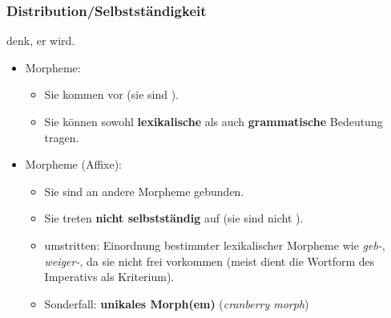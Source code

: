 \begin{frame}
\frametitle{Distribution/Selbstständigkeit}

\ea {} denk,  er    wird.
\z

\begin{itemize}

	\item {} Morpheme: 
	
	\begin{itemize}
		\item Sie kommen  vor (sie sind ).
		
		\item Sie können sowohl \textbf{lexikalische} als auch \textbf{grammatische} Bedeutung tragen.
	\end{itemize}
	
\pause
	
	\item {} Morpheme (Affixe): 
	
	\begin{itemize}
		\item Sie sind an andere Morpheme gebunden.
		
		\item Sie treten \textbf{nicht selbstständig} auf (sie sind nicht ).
		
		\item umstritten: Einordnung bestimmter lexikalischer Morpheme wie \emph{geb-}, \emph{weiger-}, da sie nicht frei vorkommen (meist dient die Wortform des Imperativs als Kriterium).
		
\pause

		\item Sonderfall: \textbf{unikales Morph(em)} (\emph{cranberry morph})
	
	\end{itemize}
	
	
\end{itemize}
\end{frame}


